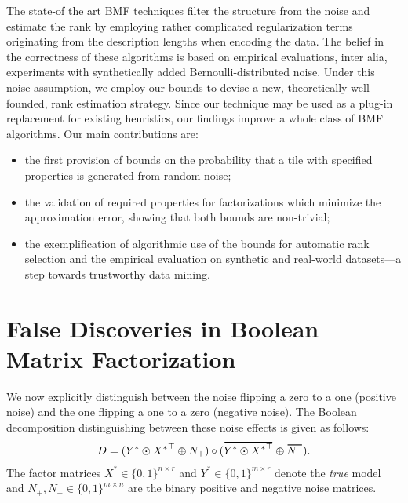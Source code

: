 The state-of the art BMF techniques filter the structure from the noise and estimate the rank by employing rather complicated regularization terms originating from the description lengths when encoding the data. The belief in the correctness of these algorithms is based on empirical evaluations, inter alia, experiments with synthetically added Bernoulli-distributed noise. 
Under this noise assumption, we employ our bounds to devise a new, theoretically well-founded, rank estimation strategy. Since our technique may be used as a plug-in replacement for existing heuristics, our findings improve a whole class of BMF algorithms.
Our main contributions are:
\begin{itemize}
\item the first provision of bounds on the probability that a tile with specified properties is generated from random noise;
\item the validation of required properties for factorizations which minimize the approximation error, showing that both bounds are non-trivial;
\item the exemplification of algorithmic use of the bounds for automatic rank selection and the empirical evaluation on synthetic and real-world datasets---a step towards trustworthy data mining. 
\end{itemize}
\section{False Discoveries in Boolean Matrix Factorization}\label{sec:TP:boundingFDR}
We now explicitly distinguish between the noise flipping a zero to a one (positive noise) and the one flipping a one to a zero (negative noise). The Boolean decomposition distinguishing between these noise effects is given as follows:
\begin{align}\label{eq:BMF0}
D=(Y^*\odot {X^*}^\top \oplus N_+) \circ (\thickbar{Y^*\odot {X^*}^\top} \oplus \thickbar{N_-}).
\end{align}
The factor matrices $X^*\in\{0,1\}^{n\times r}$ and $Y^*\in\{0,1\}^{m\times r}$ denote the \emph{true} model and $N_+,N_-\in\{0,1\}^{m\times n}$ are the binary positive and negative noise matrices. 

